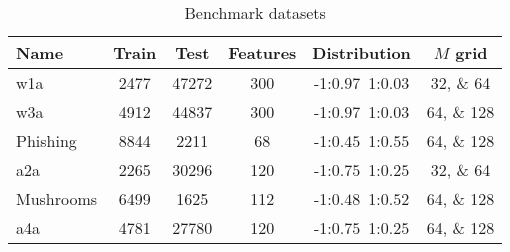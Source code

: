 
\begin{table}
\centering
\caption{Benchmark datasets}
\label{tab:datasets}
\begin{tabular}{lSSScc}
\toprule
Name & {Train} & {Test} & {Features} & {Distribution} & {$M$ grid} \\
\midrule
w1a & 2477 & 47272 & 300 & -1:$0.97$\,\,\,1:$0.03$ &
\numlist[list-pair-separator={, }]{32;64} \\
w3a & 4912 & 44837 & 300 & -1:$0.97$\,\,\,1:$0.03$ &
\numlist[list-pair-separator={, }]{64;128} \\
Phishing & 8844 & 2211 & 68 & -1:$0.45$\,\,\,1:$0.55$ &
\numlist[list-pair-separator={, }]{64;128} \\
a2a & 2265 & 30296 & 120 & -1:$0.75$\,\,\,1:$0.25$ &
\numlist[list-pair-separator={, }]{32;64} \\
Mushrooms & 6499 & 1625 & 112 & -1:$0.48$\,\,\,1:$0.52$ &
\numlist[list-pair-separator={, }]{64;128} \\
a4a & 4781 & 27780 & 120 & -1:$0.75$\,\,\,1:$0.25$ &
\numlist[list-pair-separator={, }]{64;128} \\
\bottomrule
\end{tabular}
\end{table}

\cleardoublepage


